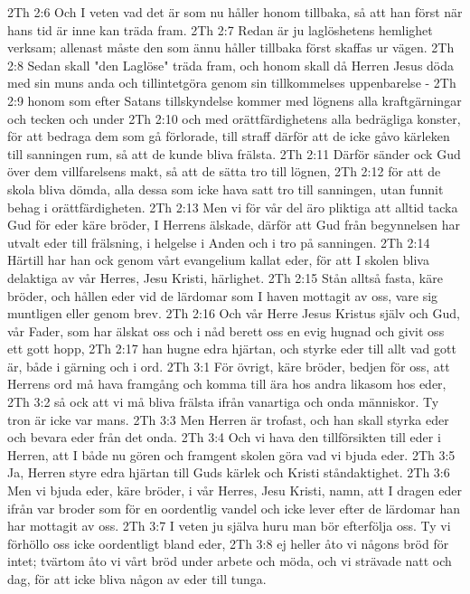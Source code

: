 2Th 2:6  Och I veten vad det är som nu håller honom tillbaka, så att han först när hans tid är inne kan träda fram.
2Th 2:7  Redan är ju laglöshetens hemlighet verksam; allenast måste den som ännu håller tillbaka först skaffas ur vägen.
2Th 2:8  Sedan skall "den Laglöse" träda fram, och honom skall då Herren Jesus döda med sin muns anda och tillintetgöra genom sin tillkommelses uppenbarelse -
2Th 2:9  honom som efter Satans tillskyndelse kommer med lögnens alla kraftgärningar och tecken och under
2Th 2:10  och med orättfärdighetens alla bedrägliga konster, för att bedraga dem som gå förlorade, till straff därför att de icke gåvo kärleken till sanningen rum, så att de kunde bliva frälsta.
2Th 2:11  Därför sänder ock Gud över dem villfarelsens makt, så att de sätta tro till lögnen,
2Th 2:12  för att de skola bliva dömda, alla dessa som icke hava satt tro till sanningen, utan funnit behag i orättfärdigheten.
2Th 2:13  Men vi för vår del äro pliktiga att alltid tacka Gud för eder käre bröder, I Herrens älskade, därför att Gud från begynnelsen har utvalt eder till frälsning, i helgelse i Anden och i tro på sanningen.
2Th 2:14  Härtill har han ock genom vårt evangelium kallat eder, för att I skolen bliva delaktiga av vår Herres, Jesu Kristi, härlighet.
2Th 2:15  Stån alltså fasta, käre bröder, och hållen eder vid de lärdomar som I haven mottagit av oss, vare sig muntligen eller genom brev.
2Th 2:16  Och vår Herre Jesus Kristus själv och Gud, vår Fader, som har älskat oss och i nåd berett oss en evig hugnad och givit oss ett gott hopp,
2Th 2:17  han hugne edra hjärtan, och styrke eder till allt vad gott är, både i gärning och i ord.
2Th 3:1  För övrigt, käre bröder, bedjen för oss, att Herrens ord må hava framgång och komma till ära hos andra likasom hos eder,
2Th 3:2  så ock att vi må bliva frälsta ifrån vanartiga och onda människor. Ty tron är icke var mans.
2Th 3:3  Men Herren är trofast, och han skall styrka eder och bevara eder från det onda.
2Th 3:4  Och vi hava den tillförsikten till eder i Herren, att I både nu gören och framgent skolen göra vad vi bjuda eder.
2Th 3:5  Ja, Herren styre edra hjärtan till Guds kärlek och Kristi ståndaktighet.
2Th 3:6  Men vi bjuda eder, käre bröder, i vår Herres, Jesu Kristi, namn, att I dragen eder ifrån var broder som för en oordentlig vandel och icke lever efter de lärdomar han har mottagit av oss.
2Th 3:7  I veten ju själva huru man bör efterfölja oss. Ty vi förhöllo oss icke oordentligt bland eder,
2Th 3:8  ej heller åto vi någons bröd för intet; tvärtom åto vi vårt bröd under arbete och möda, och vi strävade natt och dag, för att icke bliva någon av eder till tunga.
